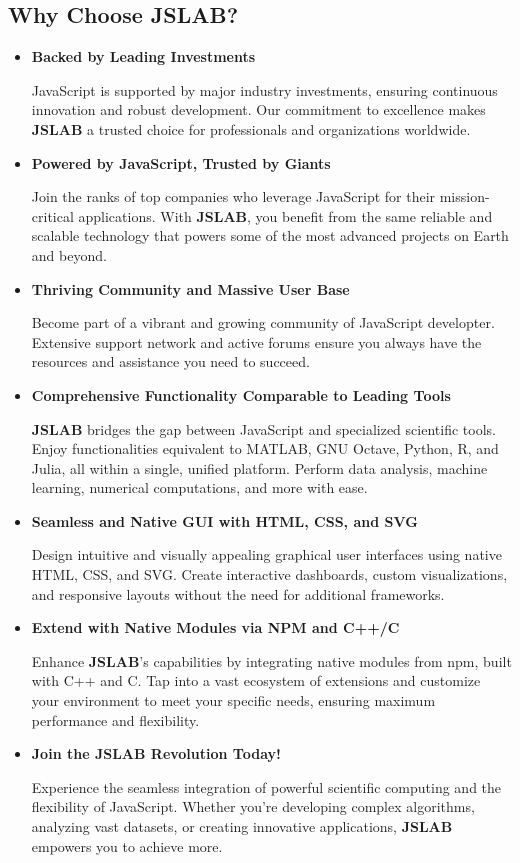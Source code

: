 \documentclass[12pt,a4paper]{article}
\begin{document}
\subsection{Why Choose JSLAB?}

\begin{itemize}
    \item \textbf{Backed by Leading Investments}

JavaScript is supported by major industry investments, ensuring continuous innovation and robust development. Our commitment to excellence makes \textbf{JSLAB} a trusted choice for professionals and organizations worldwide.

\item \textbf{Powered by JavaScript, Trusted by Giants}

Join the ranks of top companies who leverage JavaScript for their mission-critical applications. With \textbf{JSLAB}, you benefit from the same reliable and scalable technology that powers some of the most advanced projects on Earth and beyond.

\item \textbf{Thriving Community and Massive User Base}

Become part of a vibrant and growing community of JavaScript developter. Extensive support network and active forums ensure you always have the resources and assistance you need to succeed.

\item \textbf{Comprehensive Functionality Comparable to Leading Tools}

\textbf{JSLAB} bridges the gap between JavaScript and specialized scientific tools. Enjoy functionalities equivalent to MATLAB, GNU Octave, Python, R, and Julia, all within a single, unified platform. Perform data analysis, machine learning, numerical computations, and more with ease.

\item \textbf{Seamless and Native GUI with HTML, CSS, and SVG}

Design intuitive and visually appealing graphical user interfaces using native HTML, CSS, and SVG. Create interactive dashboards, custom visualizations, and responsive layouts without the need for additional frameworks.

\item \textbf{Extend with Native Modules via NPM and C++/C}

Enhance \textbf{JSLAB}’s capabilities by integrating native modules from npm, built with C++ and C. Tap into a vast ecosystem of extensions and customize your environment to meet your specific needs, ensuring maximum performance and flexibility.

\item \textbf{Join the JSLAB Revolution Today!}

Experience the seamless integration of powerful scientific computing and the flexibility of JavaScript. Whether you're developing complex algorithms, analyzing vast datasets, or creating innovative applications, \textbf{JSLAB} empowers you to achieve more.

\end{itemize}
\end{document}
